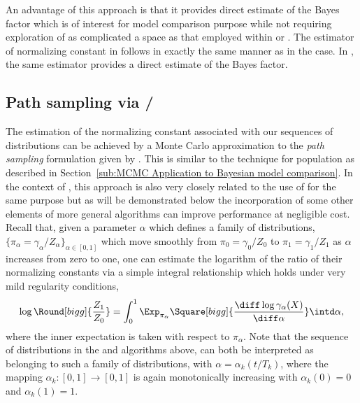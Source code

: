 

An advantage of this approach is that it provides direct estimate of the Bayes factor which is of interest for model comparison purpose while not requiring exploration of as complicated a space as that employed within \rjmcmc or \smc[1]. The estimator of normalizing constant in \smc[3] follows in exactly the same manner as in the \smc[2] case. In \smc[3], the same estimator provides a direct estimate of the Bayes factor.

\subsection{Path sampling via \smc[2]/\smc[3]}
\label{sub:Path Sampling via smc2/smc3}

The estimation of the normalizing constant associated with our sequences of distributions can be achieved by a Monte Carlo approximation to the \emph{path sampling} formulation given by \cite{Gelman:1998ei}. This is similar to the technique for population \mcmc as described in Section~\ref{sub:MCMC Application to Bayesian model comparison}. In the context of \smc, this approach is also very closely related to the use of \ais for the same purpose \cite{Neal:2001we} but as will be demonstrated below the incorporation of some other elements of more general \smc algorithms can improve performance at negligible cost. Recall that, given a parameter $\alpha$ which defines a family of distributions, $\{\pi_{\alpha} = \gamma_{\alpha} / Z_\alpha\}_{\alpha \in [0,1]}$ which move smoothly from $\pi_0 = \gamma_0 / Z_0$ to $\pi_1 = \gamma_1 / Z_1$ as $\alpha$ increases from zero to one, one can estimate the logarithm of the ratio of their normalizing constants via a simple integral relationship which holds under very mild regularity conditions,
\begin{equation*}
  \log\Round[bigg]{\frac{Z_1}{Z_0}} =
  \int_{0}^{1} \Exp_{\pi_\alpha} \Square[bigg]{
    \frac{\diff\log\gamma_{\alpha}(X)}{\diff\alpha}
  } \intd\alpha,
\end{equation*}
where the inner expectation is taken with respect to $\pi_{\alpha}$. Note that the sequence of distributions in the \smc[2] and \smc[3] algorithms above, can both be interpreted as belonging to such a family of distributions, with $\alpha = \alpha_k(t/T_k)$, where the mapping $\alpha_k:[0,1]\to[0,1]$ is again monotonically increasing with $\alpha_k(0) = 0$ and $\alpha_k(1) = 1$.

